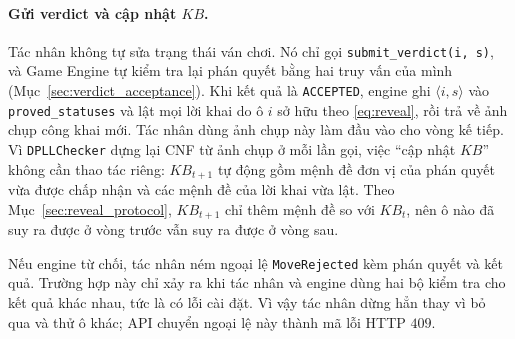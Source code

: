 \begin{sloppypar}
\paragraph{Gửi verdict và cập nhật $\mathit{KB}$.}
Tác nhân không tự sửa trạng thái ván chơi. Nó chỉ gọi
\texttt{submit\_verdict(i, s)}, và Game Engine tự kiểm tra lại phán quyết bằng
hai truy vấn của mình (Mục~\ref{sec:verdict_acceptance}). Khi kết quả là
\texttt{ACCEPTED}, engine ghi $\langle i, s\rangle$ vào
\texttt{proved\_statuses} và lật mọi lời khai do ô $i$ sở hữu theo
\eqref{eq:reveal}, rồi trả về ảnh chụp công khai mới. Tác nhân dùng ảnh chụp
này làm đầu vào cho vòng kế tiếp. Vì \texttt{DPLLChecker} dựng lại CNF từ
ảnh chụp ở mỗi lần gọi, việc ``cập nhật $\mathit{KB}$'' không cần thao tác
riêng: $\mathit{KB}_{t+1}$ tự động gồm mệnh đề đơn vị của phán quyết vừa được
chấp nhận và các mệnh đề của lời khai vừa lật. Theo Mục~\ref{sec:reveal_protocol},
$\mathit{KB}_{t+1}$ chỉ thêm mệnh đề so với $\mathit{KB}_t$, nên ô nào đã suy ra
được ở vòng trước vẫn suy ra được ở vòng sau.

Nếu engine từ chối, tác nhân ném ngoại lệ \texttt{MoveRejected} kèm phán quyết
và kết quả. Trường hợp này chỉ xảy ra khi tác nhân và engine dùng hai bộ kiểm
tra cho kết quả khác nhau, tức là có lỗi cài đặt. Vì vậy tác nhân dừng hẳn
thay vì bỏ qua và thử ô khác; API chuyển ngoại lệ này thành mã lỗi HTTP $409$.


\end{sloppypar}
